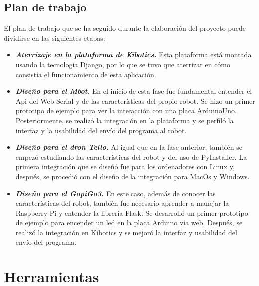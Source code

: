 \documentclass{report}
\begin{document}
\section{Plan de trabajo}

El plan de trabajo que se ha seguido durante la elaboración del proyecto puede dividirse en las siguientes etapas:
\begin{itemize}
	\item \textit{\textbf{Aterrizaje en la plataforma de Kibotics.}} Esta plataforma está montada usando la tecnología Django, por lo que se tuvo que aterrizar en cómo consistía el funcionamiento de esta aplicación.
	\item \textit{\textbf{Diseño para el Mbot.}} En el inicio de esta fase fue fundamental entender el Api del Web Serial y de las características del propio robot. Se hizo un primer prototipo de ejemplo para ver la interacción con una placa ArduinoUno. Posteriormente, se realizó la integración en la plataforma y se perfiló la interfaz y la usabilidad del envío del programa al robot.
	\item \textit{\textbf{Diseño para el dron Tello.}} Al igual que en la fase anterior, también se empezó estudiando las características del robot y del uso de PyInstaller. La primera integración que se diseñó fue para los ordenadores con Linux y, después, se procedió con el diseño de la integración para MacOs y Windows.
	\item \textit{\textbf{Diseño para el GopiGo3.}} En este caso, además de conocer las características del robot, también fue necesario aprender a manejar la Raspberry Pi y entender la librería Flask. Se desarrolló un primer prototipo de ejemplo para encender un led en la placa Arduino vía web. Después, se realizó la integración en Kibotics y se mejoró la interfaz y usabilidad del envío del programa.
	
\end{itemize}






\chapter{Herramientas}
\end{document}
